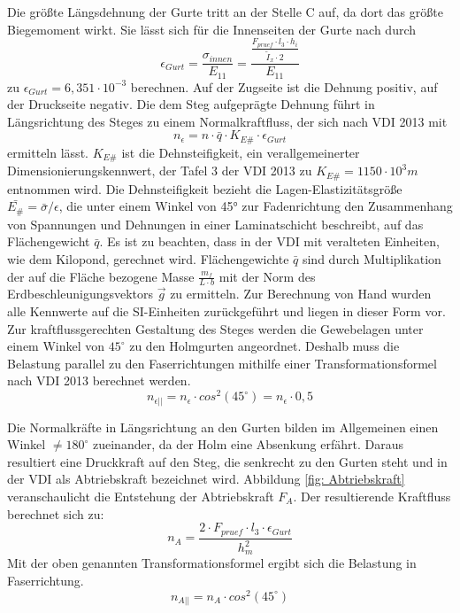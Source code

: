 \noindent Die größte Längsdehnung der Gurte tritt an der Stelle C auf, da dort das größte Biegemoment wirkt. Sie lässt sich für die Innenseiten der Gurte nach \cite{item16} durch
\begin{equation}
	\epsilon_{Gurt}=\frac{\sigma_{innen}}{E_{11}}=\frac{\frac{F_{pruef}\cdot l_{3}\cdot h_{i}}{\tilde{I}_{x}\cdot 2}}{E_{11}}
\end{equation}  
 zu $ \epsilon_{Gurt}=6,351\cdot 10^{-3} $ berechnen. Auf der Zugseite ist die Dehnung positiv, auf der Druckseite negativ. Die dem Steg aufgeprägte Dehnung führt in Längsrichtung des Steges zu einem Normalkraftfluss, der sich nach VDI 2013 mit
 \begin{equation}
 	n_{\epsilon}=n\cdot \bar{q}\cdot K_{E\#}\cdot \epsilon_{Gurt}
 \end{equation} 
ermitteln lässt. $ K_{E\#} $ ist die Dehnsteifigkeit, ein verallgemeinerter Dimensionierungskennwert, der Tafel 3 der VDI 2013 zu $ K_{E\#}=1150\cdot 10^{3}m $ entnommen wird. Die Dehnsteifigkeit bezieht die Lagen-Elastizitätsgröße $ \bar{E_{\#}}=\bar{\sigma}/ \epsilon $, die unter einem Winkel von 45° zur Fadenrichtung den Zusammenhang von Spannungen und Dehnungen in einer Laminatschicht beschreibt, auf das Flächengewicht $ \bar{q} $.
Es ist zu beachten, dass in der VDI mit veralteten Einheiten, wie dem Kilopond, gerechnet wird. Flächengewichte $ \bar{q} $ sind durch Multiplikation der auf die Fläche bezogene Masse $ \frac{m_{f}}{L\cdot b} $ mit der Norm des Erdbeschleunigungsvektors $ \vec{g} $ zu ermitteln. Zur Berechnung von Hand wurden alle Kennwerte auf die SI-Einheiten zurückgeführt und liegen in dieser Form vor.\\

\noindent Zur kraftflussgerechten Gestaltung des Steges werden die Gewebelagen unter einem Winkel von $ 45^{\circ} $ zu den Holmgurten angeordnet. Deshalb muss die Belastung parallel zu den Faserrichtungen mithilfe einer Transformationsformel nach VDI 2013 berechnet werden.
\begin{equation}
	n_{\epsilon||}=n_{\epsilon}\cdot cos^{2}\left(45^{\circ} \right)=n_{\epsilon}\cdot 0,5 
\end{equation}

\noindent Die Normalkräfte in Längsrichtung an den Gurten bilden im Allgemeinen einen Winkel $ \neq180^{\circ} $ zueinander, da der Holm eine Absenkung erfährt. Daraus resultiert eine Druckkraft auf den Steg, die senkrecht zu den Gurten steht und in der VDI als Abtriebskraft bezeichnet wird. Abbildung \ref{fig: Abtriebskraft} veranschaulicht die Entstehung der Abtriebskraft $ F_{A} $. Der resultierende Kraftfluss berechnet sich zu:
\begin{equation}
	n_{A}=\frac{2\cdot F_{pruef}\cdot l_{3}\cdot\epsilon_{Gurt}}{h_{m}^{2}}
\end{equation}
 Mit der oben genannten Transformationsformel ergibt sich die Belastung in Faserrichtung.
 \begin{equation}
 	n_{A||}=n_{A}\cdot cos^{2}\left(45^{\circ} \right)
 \end{equation} 

